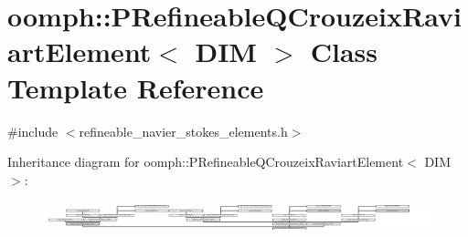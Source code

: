 \hypertarget{classoomph_1_1PRefineableQCrouzeixRaviartElement}{}\section{oomph\+:\+:P\+Refineable\+Q\+Crouzeix\+Raviart\+Element$<$ D\+IM $>$ Class Template Reference}
\label{classoomph_1_1PRefineableQCrouzeixRaviartElement}


{\ttfamily \#include $<$refineable\+\_\+navier\+\_\+stokes\+\_\+elements.\+h$>$}

Inheritance diagram for oomph\+:\+:P\+Refineable\+Q\+Crouzeix\+Raviart\+Element$<$ D\+IM $>$\+:\begin{figure}[H]
\begin{center}
\leavevmode
\includegraphics[height=0.911805cm]{classoomph_1_1PRefineableQCrouzeixRaviartElement}
\end{center}
\end{figure}

